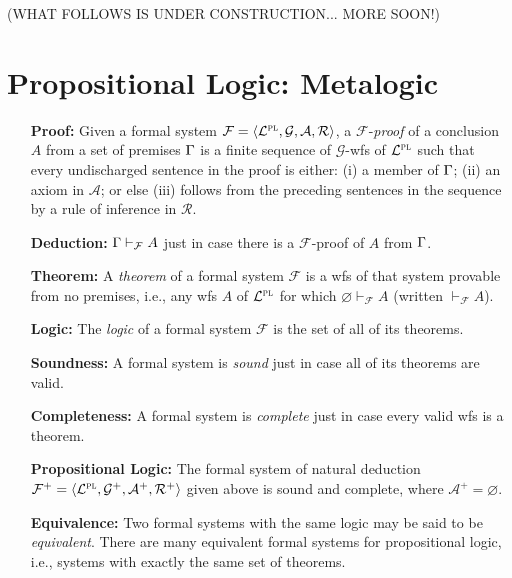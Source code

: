 \documentclass[a4paper, 11pt]{article} %
\begin{document}
\pagebreak

\noindent
(WHAT FOLLOWS IS UNDER CONSTRUCTION... MORE SOON!)

  


\section*{\sc Propositional Logic: Metalogic}

\begin{enumerate}[leftmargin=1.2in,labelsep=.15in] 
\item[\bf Proof:] Given a formal system $\mathcal{F}=\langle\mathcal{L}^{\textsc{pl}},\mathcal{G},\mathcal{A},\mathcal{R}\rangle$, a $\mathcal{F}$-\textit{proof} of a conclusion $A$ from a set of premises $\Gamma$ is a finite sequence of $\mathcal{G}$-wfs of $\mathcal{L}^{\textsc{pl}}$ such that every undischarged sentence in the proof is either: (i) a member of $\Gamma$; (ii) an axiom in $\mathcal{A}$; or else (iii) follows from the preceding sentences in the sequence by a rule of inference in $\mathcal{R}$.
\item[\bf Deduction:] $\Gamma\vdash_{\mathcal{F}} A$ just in case there is a $\mathcal{F}$-proof of $A$ from $\Gamma$.
\item[\bf Theorem:] A \textit{theorem} of a formal system $\mathcal{F}$ is a wfs of that system provable from no premises, i.e., any wfs $A$ of $\mathcal{L}^{\textsc{pl}}$ for which $\varnothing\vdash_{\mathcal{F}}A$ (written $\vdash_{\mathcal{F}}A$).
\item[\bf Logic:] The \textit{logic} of a formal system $\mathcal{F}$ is the set of all of its theorems.
\item[\bf Soundness:] A formal system is \textit{sound} just in case all of its theorems are valid.
\item[\bf Completeness:] A formal system is \textit{complete} just in case every valid wfs is a theorem.
\item[\bf Propositional Logic:] The formal system of natural deduction $\mathcal{F}^+=\langle\mathcal{L}^{\textsc{pl}},\mathcal{G}^+,\mathcal{A}^+,\mathcal{R}^+\rangle$ given above is sound and complete, where $\mathcal{A}^+=\varnothing$. 
\item[\bf Equivalence:] Two formal systems with the same logic may be said to be \textit{equivalent}. There are many equivalent formal systems for propositional logic, i.e., systems with exactly the same set of theorems.
\end{enumerate}
\end{document}
